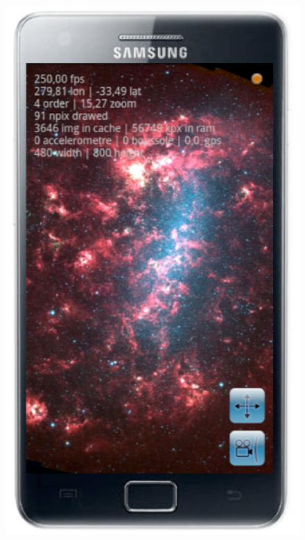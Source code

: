 \documentclass[11pt,twoside]{article}
\begin{document}
\begin{figure}[h]
\includegraphics[scale=0.28]{O28_f2.eps}

\end{figure}
\end{document}
